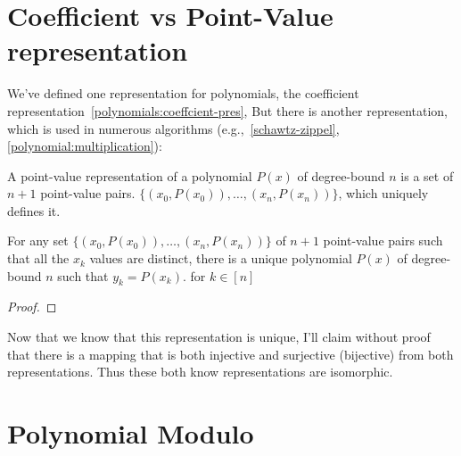 \section{Coefficient vs Point-Value representation}\label{polynomials:point-val-representation}
We've defined one representation for polynomials, the coefficient representation~\ref{polynomials:coeffcient-pres},
But there is another representation, which is used in numerous algorithms (e.g.,~\ref{schawtz-zippel},\ref{polynomial:multiplication}):


A point-value representation of a polynomial $P(x)$ of degree-bound $n$ is a set of $n+1$ point-value pairs.
$ \{ (x_0,P(x_0)),\dots , (x_{n}, P(x_{n})) \}$, which uniquely defines it.

\begin{theorem}
  For any set $ \{ (x_0,P(x_0)),\dots , (x_{n}, P(x_{n})) \}$ of $n+1$
  point-value pairs such that all the $x_k$ values are distinct,
  there is a unique polynomial $P(x)$ of degree-bound $n$ such that
  $y_k = P(x_k)$. for $k\in[n]$ 
\end{theorem}

\begin{proof}
\end{proof}

Now that we know that this representation is unique, I'll claim without proof that
there is a mapping that is both injective and surjective (bijective) from both representations.
Thus these both know representations are isomorphic.

\section{Polynomial Modulo}
